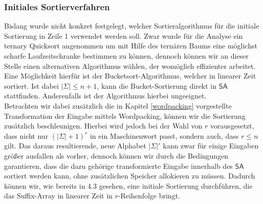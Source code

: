 \subsubsection{Initiales Sortierverfahren}
Bislang wurde nicht konkret festgelegt, welcher Sortieralgorithmus für die initiale Sortierung in Zeile 1 verwendet werden soll. Zwar wurde für die Analyse ein ternary Quicksort angenommen um mit Hilfe des ternären Baums eine möglichst scharfe Laufzeitschranke bestimmen zu können, dennoch können wir an dieser Stelle einen alternativen Algorithmus wählen, der womöglich effizienter arbeitet.\\
Eine Möglichkeit hierfür ist der Bucketsort-Algorithmus, welcher in linearer Zeit sortiert. Ist dabei $|\Sigma| \leq n+1$, kann die Bucket-Sortierung direkt in $\mathsf{SA}$ stattfinden. Anderenfalls ist der Algorithmus hierbei ungeeignet.\\
Betrachten wir dabei zusätzlich die in Kapitel \ref{wordpacking} vorgestellte Transformation der Eingabe mittels Wordpacking, können wir die Sortierung zusätzlich beschleunigen. Hierbei wird jedoch bei der Wahl von $r$ vorausgesetzt, dass nicht nur $(|\Sigma| + 1)^r$ in ein Maschinenwort passt, sondern auch, dass $r \leq  n$ gilt. Das daraus resultierende, neue Alphabet $|\Sigma|'$ kann zwar für einige Eingaben größer ausfallen als vorher, dennoch können wir durch die Bedingungen garantieren, dass die dazu gehörige transformierte Eingabe innerhalb des $\mathsf{SA}$ sortiert werden kann, ohne zusätzlichen Speicher allokieren zu müssen. Dadurch können wir, wie bereits in 4.3 gesehen, eine initiale Sortierung durchführen, die das Suffix-Array in linearer Zeit in $r$-Reihenfolge bringt.